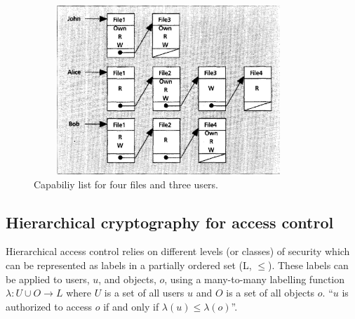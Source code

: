 \documentclass[12pt, titlepage]{article}
\begin{document}
\begin{figure}
\centerline{\includegraphics[height=2.5in,width=4in,angle=0]{capabilities.pdf}}
\caption{Capabiliy list for four files and three users.\cite{accessControlPrinciples}}
\label{fig:capabilities}
\end{figure}

\subsection{Hierarchical cryptography for access control}
Hierarchical access control relies on different levels (or classes) of security which can be represented as labels in a partially ordered set (L, $≤$). These labels can be applied to users, $u$, and objects, $o$, using a many-to-many labelling function $\lambda : U ∪ O → L$ where $U$ is a set of all users $u$ and $O$ is a set of all objects $o$. ``$u$ is authorized to access $o$ if and only if $\lambda(u)≤\lambda(o)$''\cite{mainPaper}.
\end{document}
